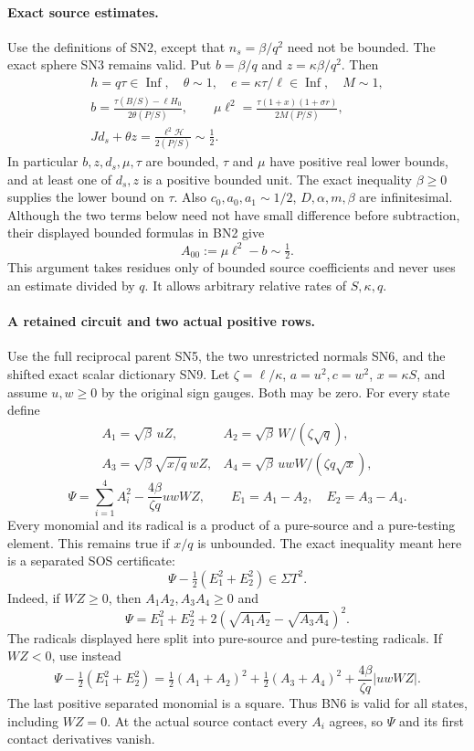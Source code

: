 \paragraph{Exact source estimates.}
Use the definitions of SN2, except that $n_s=\beta/q^2$ need not be
bounded. The exact sphere SN3 remains valid. Put $b=\beta/q$ and
$z=\kappa\beta/q^2$. Then
\[
\begin{gathered}
 h=q\tau\in\operatorname{Inf},\quad\theta\sim1,\quad
 e=\kappa\tau/\ell\in\operatorname{Inf},\quad M\sim1,\\
 b=\frac{\tau(B/S)-\ell H_0}{2\theta(P/S)},\qquad
 \mu\ell^2=\frac{\tau(1+x)(1+\sigma r)}{2M(P/S)},\\
 Jd_s+\theta z=\frac{\ell^2\mathcal H}{2(P/S)}\sim\tfrac12.
\end{gathered}\tag{BN2}
\]
In particular $b,z,d_s,\mu,\tau$ are bounded, $\tau$ and $\mu$
have positive real lower bounds, and at least one of $d_s,z$ is a
positive bounded unit. The exact inequality $\beta\ge0$ supplies
the lower bound on $\tau$. Also
$c_0,a_0,a_1\sim1/2$, $D,\alpha,m,\beta$ are infinitesimal.
Although the two terms below need not have small difference before
subtraction, their displayed bounded formulas in BN2 give
\[
                  A_{00}:=\mu\ell^2-b\sim\tfrac12.
 \tag{BN3}
\]
This argument takes residues only of bounded source coefficients and
never uses an estimate divided by $q$. It allows arbitrary relative
rates of $S,\kappa,q$.

\paragraph{A retained circuit and two actual positive rows.}
Use the full reciprocal parent SN5, the two unrestricted normals SN6,
and the shifted exact scalar dictionary SN9. Let $\zeta=\ell/\kappa$,
$a=u^2,c=w^2$, $x=\kappa S$, and assume $u,w\ge0$ by the original
sign gauges. Both may be zero. For every state define
\[
\begin{array}{ll}
 A_1=\sqrt\beta\,uZ,&A_2=\sqrt\beta\,W/(\zeta\sqrt q),\\
 A_3=\sqrt\beta\sqrt{x/q}\,wZ,
 &A_4=\sqrt\beta\,uwW/(\zeta q\sqrt x),
\end{array}\tag{BN4}
\]
\[
 \Psi=\sum_{i=1}^4 A_i^2-\frac{4\beta}{\zeta q}uwWZ,
 \qquad E_1=A_1-A_2,\quad E_2=A_3-A_4.
 \tag{BN5}
\]
Every monomial and its radical is a product of a pure-source and a
pure-testing element. This remains true if $x/q$ is unbounded.
The exact inequality meant here is a separated SOS certificate:
\[
                    \Psi-\tfrac12(E_1^2+E_2^2)\in\Sigma T^2.
 \tag{BN6}
\]
Indeed, if $WZ\ge0$, then $A_1A_2,A_3A_4\ge0$ and
\[
 \Psi=E_1^2+E_2^2+
              2(\sqrt{A_1A_2}-\sqrt{A_3A_4})^2.
\]
The radicals displayed here split into pure-source and pure-testing
radicals. If $WZ<0$, use instead
\[
 \Psi-\tfrac12(E_1^2+E_2^2)
 =\tfrac12(A_1+A_2)^2+\tfrac12(A_3+A_4)^2
                  +\frac{4\beta}{\zeta q}|uwWZ|.
\]
The last positive separated monomial is a square. Thus BN6 is valid
for all states, including $WZ=0$. At the actual source contact every
$A_i$ agrees, so $\Psi$ and its first contact derivatives vanish.

